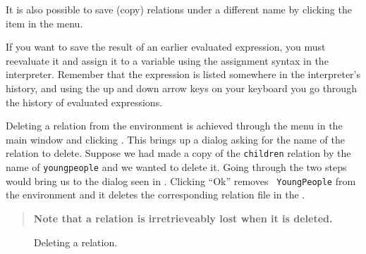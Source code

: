 \documentclass[a4,14pt,latin1]{article}
\begin{document}
It is also possible to save (copy) relations under a different name by
clicking the  item in the  menu.

If you want to save the result of an earlier evaluated expression, you
must reevaluate it and assign it to a variable using the \RAS{}
assignment syntax in the interpreter. Remember that the expression is
listed somewhere in the interpreter's history, and using the up and
down arrow keys on your keyboard you go through the history of
evaluated expressions.

Deleting a relation from the environment is achieved through the
 menu in the main window and clicking . This brings up a dialog asking for the name of the
relation to delete. Suppose we had made a copy of the {\tt children}
relation by the name of {\tt youngpeople} and we wanted to delete
it. Going through the two steps would bring us to the dialog seen in
. Clicking ``Ok'' removes {\tt
  YoungPeople} from the environment and it deletes the corresponding
relation file in the .

\begin{quote}
  \bf Note that a relation is irretrieveably lost when it is deleted.
\end{quote}

\begin{figure}[bp]
  \centering
  \caption{Deleting a relation.}
  \label{fig:delete_relation}
\end{figure}
\end{document}
